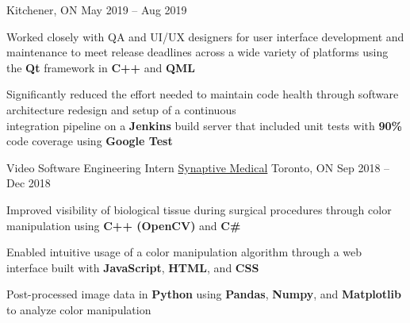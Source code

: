 \documentclass[]{awesome-cv}
\begin{document}
\begin{cventries}
	{Kitchener, ON}
	{May 2019 – Aug 2019}
	{\begin{cvitems}
		\item {Worked closely with QA and UI/UX designers for user interface development and maintenance to meet release deadlines across a wide variety of platforms using the \textbf{Qt} framework in \textbf{C++} and \textbf{QML}}
		\item {Significantly reduced the effort needed to maintain code health through software architecture redesign and setup of a continuous \\integration pipeline on a \textbf{Jenkins} build server that included unit tests with \textbf{90\%} code coverage using \textbf{Google Test}}
		\end{cvitems}}
	\cventry
	{Video Software Engineering Intern}
	{\href{https://www.synaptivemedical.com/}{Synaptive Medical}}
	{Toronto, ON}
	{Sep 2018 – Dec 2018}
	{\begin{cvitems}
		\item {Improved visibility of biological tissue during surgical procedures through color manipulation using \textbf{C++ (OpenCV)} and \textbf{C\#}}
		\item {Enabled intuitive usage of a color manipulation algorithm through a web interface built with \textbf{JavaScript}, \textbf{HTML}, and \textbf{CSS}}
		\item {Post-processed image data in \textbf{Python} using \textbf{Pandas}, \textbf{Numpy}, and \textbf{Matplotlib} to analyze color manipulation}
		\end{cvitems}}
\end{cventries}
\end{document}
